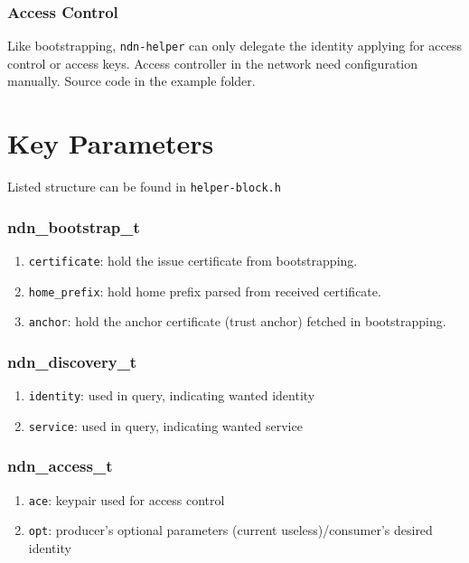 \documentclass[a4paper, 11pt]{article}
\begin{document}
        \subsubsection*{Access Control}
        Like bootstrapping, \texttt{ndn-helper} can only delegate the identity applying for access control or access keys. Access controller in the network need configuration manually. Source code in the example folder.
        
        \section*{Key Parameters}
        Listed structure can be found in \texttt{helper-block.h} 

        \subsubsection*{ndn\_bootstrap\_t}
        \begin{enumerate}
        \item \texttt{certificate}: hold the issue certificate from bootstrapping.
        \item \texttt{home\_prefix}: hold home prefix parsed from received certificate.
        \item \texttt{anchor}: hold the anchor certificate (trust anchor) fetched in bootstrapping.
        \end{enumerate}

        \subsubsection*{ndn\_discovery\_t}
        \begin{enumerate}
                \item \texttt{identity}: used in query, indicating wanted identity
                \item \texttt{service}: used in query, indicating wanted service
        \end{enumerate}        

        \subsubsection*{ndn\_access\_t}
        \begin{enumerate}
                \item \texttt{ace}: keypair used for access control
                \item \texttt{opt}: producer's optional parameters (current useless)/consumer's desired identity
        \end{enumerate}  
\end{document}
